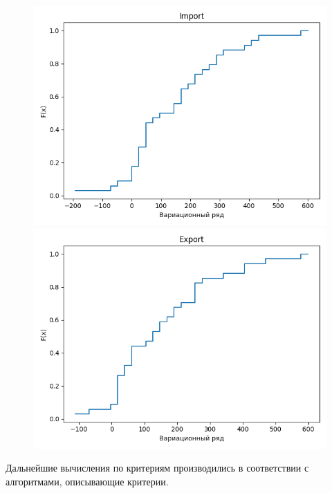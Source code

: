 \begin{figure}[H]
	\begin{minipage}[H]{0.49\linewidth}
		\begin{center}
			\includegraphics[width=\linewidth]{figures/Import}
		\end{center}
	\end{minipage}
	\hfill
	\begin{minipage}[H]{0.49\linewidth}
		\begin{center}
			\includegraphics[width=\linewidth]{figures/Export}
		\end{center}
	\end{minipage}
\end{figure}

Дальнейшие вычисления по критериям производились в соответствии с алгоритмами, описывающие критерии.




